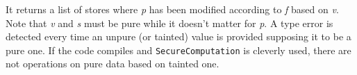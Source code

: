 It returns a list of stores where \textit{p} has been modified according to \textit{f} based on \textit{v}. Note that \textit{v} and \textit{s} must be pure while it doesn't matter for \textit{p}. A type error is detected every time an unpure (or tainted) value is provided supposing it to be a pure one. If the code compiles and \texttt{SecureComputation} is cleverly used, there are not operations on pure data based on tainted one. 